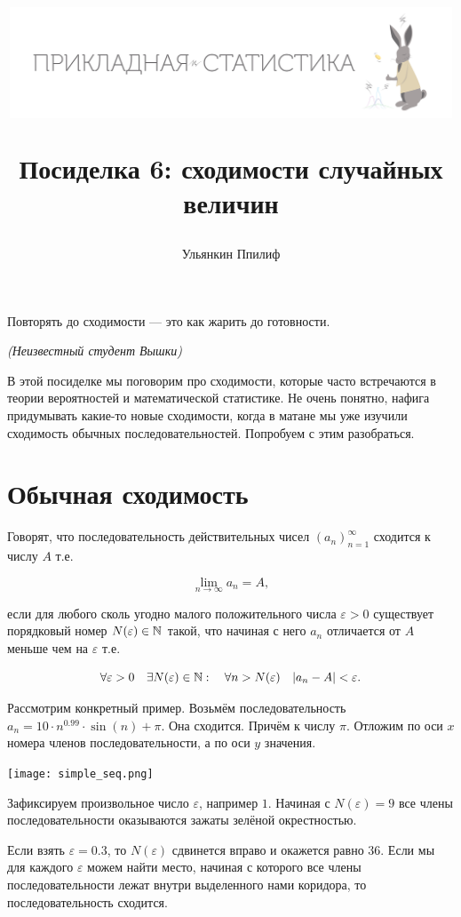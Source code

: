 \documentclass[12pt, a4paper, oneside]{article}
\title{
\begin{center} 
\includegraphics[width=0.99\textwidth]{logo.png}
\end{center}

Посиделка 6: сходимости случайных величин}
\date{ } %
\author{Ульянкин Ппилиф}
\begin{document}

\maketitle

\epigraph{Повторять до сходимости --- это как жарить до готовности.}{\textit{(Неизвестный студент Вышки)}}

В этой посиделке мы поговорим про сходимости, которые часто встречаются в теории вероятностей и математической статистике. Не очень понятно, нафига придумывать какие-то новые сходимости, когда в матане мы уже изучили сходимость обычных последовательностей. Попробуем с этим разобраться. 


\section{Обычная сходимость}

Говорят, что последовательность действительных чисел $(a_n)_{n=1}^{\infty}$ сходится к числу $A$ т.е.

\[ 
\lim_{n \to \infty} a_n = A,
\]

если для любого сколь угодно малого положительного числа $\varepsilon > 0$ существует порядковый номер $N(\varepsilon) \in \mathbb N$ такой, что начиная с него $a_n$ отличается от $A$ меньше чем на $\varepsilon$ т.е. 

\[
\forall \varepsilon > 0 \quad  \exists N(\varepsilon) \in \mathbb N : \quad  \forall n > N(\varepsilon) \quad |a_n - A| < \varepsilon.
\]

Рассмотрим конкретный пример. Возьмём последовательность $a_n = 10 \cdot n^{0.99} \cdot \sin(n) + \pi.$ Она сходится. Причём к числу $\pi$. Отложим по оси $x$ номера членов последовательности, а по оси $y$ значения. 

\begin{center} 
\texttt{[image: simple\_seq.png]}
\end{center} 

Зафиксируем произвольное число $\varepsilon$, например $1$. Начиная с $N(\varepsilon) = 9$ все члены последовательности оказываются зажаты зелёной окрестностью. 

Если взять $\varepsilon = 0.3$, то $N(\varepsilon)$ сдвинется вправо и окажется равно $36$. Если мы для каждого $\varepsilon$ можем найти место, начиная с которого все члены последовательности лежат внутри выделенного нами коридора, то последовательность сходится.
\end{document}
